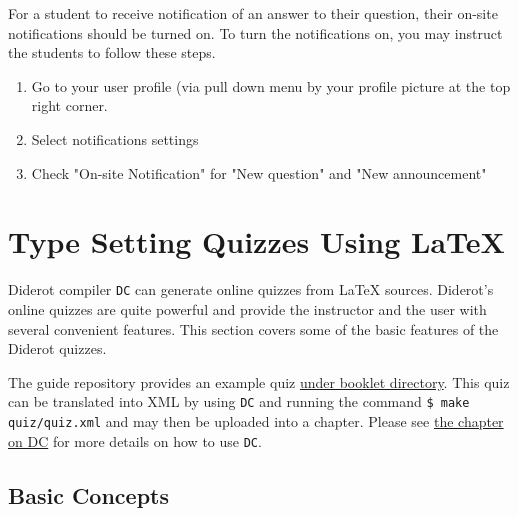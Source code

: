 \begin{cluster}
\label{grp:grm:quiz::on-site-notifications}

\begin{gram}
\label{grm:quiz::on-site-notifications}
For a student to receive notification of an answer to their question,
their on-site notifications should be turned on.  
To turn the notifications on, you may instruct the students to follow
these steps.
\begin{enumerate}
\item  Go to your user profile (via pull down menu by your profile picture at the top right corner. 

\item Select notifications settings

\item Check "On-site Notification" for "New question" and "New announcement"
\end{enumerate}

\end{gram}
\end{cluster}


\section{Type Setting Quizzes Using LaTeX}
\label{ch:quiz::typesetting}

\begin{cluster}
\label{grp:grm:quiz::compiler}

\begin{gram}
\label{grm:quiz::compiler}
Diderot compiler \lstinline`DC` can generate online quizzes from LaTeX sources. Diderot’s online quizzes are quite powerful and provide the instructor and the user with several convenient features. This section covers some of the basic features of the Diderot quizzes.  

The guide repository provides an example quiz 
\href{https://github.com/diderot-edu/diderot-guide/tree/master/booklet}{under booklet directory}. 
This quiz can be translated into XML by using \lstinline`DC` and running the command 
\lstinline`$ make quiz/quiz.xml`
and may then be uploaded into a chapter. 
Please see \href{ch:dc}{the chapter on DC} for more details on how to use \lstinline`DC`.

\end{gram}
\end{cluster}


\subsection{Basic Concepts}
\label{sec:quiz::basic-concepts}

